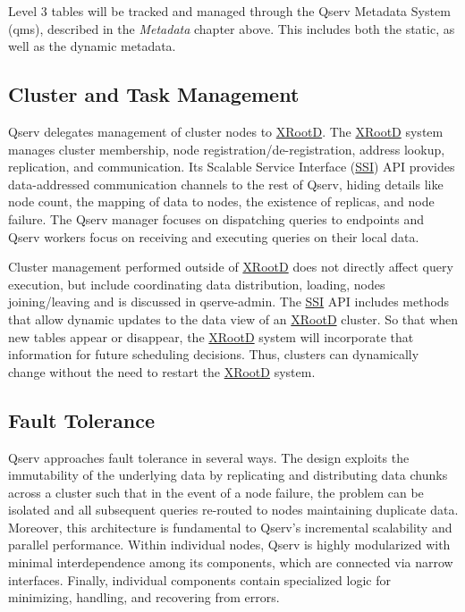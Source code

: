 \documentclass[DM,lsstdraft,toc]{lsstdoc}
\begin{document}
Level 3 tables will be tracked and managed through the Qserv Metadata
System (qms), described in the \emph{Metadata} chapter above. This
includes both the static, as well as the dynamic metadata.

\subsection{Cluster and Task
Management}\label{cluster-and-task-management}

Qserv delegates management of cluster nodes to
\href{http://xrootd.org}{XRootD}. The \href{http://xrootd.org}{XRootD}
system manages cluster membership, node registration/de-registration,
address lookup, replication, and communication. Its Scalable Service
Interface (\href{}{SSI}) API provides data-addressed communication
channels to the rest of Qserv, hiding details like node count, the
mapping of data to nodes, the existence of replicas, and node failure.
The Qserv manager focuses on dispatching queries to endpoints and Qserv
workers focus on receiving and executing queries on their local data.

Cluster management performed outside of \href{http://xrootd.org}{XRootD}
does not directly affect query execution, but include coordinating data
distribution, loading, nodes joining/leaving and is discussed in
qserve-admin. The \href{}{SSI} API includes methods that allow dynamic
updates to the data view of an \href{http://xrootd.org}{XRootD} cluster.
So that when new tables appear or disappear, the
\href{http://xrootd.org}{XRootD} system will incorporate that
information for future scheduling decisions. Thus, clusters can
dynamically change without the need to restart the
\href{http://xrootd.org}{XRootD} system.

\subsection{Fault Tolerance}\label{fault-tolerance}

Qserv approaches fault tolerance in several ways. The design exploits
the immutability of the underlying data by replicating and distributing
data chunks across a cluster such that in the event of a node failure,
the problem can be isolated and all subsequent queries re-routed to
nodes maintaining duplicate data. Moreover, this architecture is
fundamental to Qserv's incremental scalability and parallel performance.
Within individual nodes, Qserv is highly modularized with minimal
interdependence among its components, which are connected via narrow
interfaces. Finally, individual components contain specialized logic for
minimizing, handling, and recovering from errors.
\end{document}
